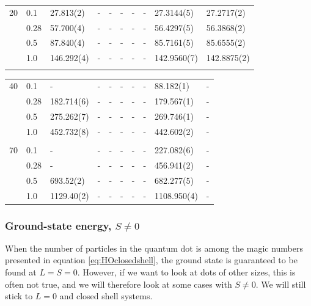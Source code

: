 {\begin{landscape}
\begin{table}
\begin{tabularx}{\hsize}{l:l|R{2.45cm}R{2.45cm}R{2.45cm}R{2.45cm}R{2.45cm}R{2.45cm}R{2.45cm}R{2.45cm}}
		20 & 0.1 & 27.813(2) & - & - & - & - & - & 27.3144(5) & 27.2717(2) \\ 
		& 0.28 & 57.700(4) & - & - & - & - & - & 56.4297(5) & 56.3868(2) \\
		& 0.5 & 87.840(4) & - & - & - & - & - & 85.7161(5) & 85.6555(2) \\
		& 1.0 & 146.292(4) & - & - & - & - & - & 142.9560(7) & 142.8875(2) \\ \hdashline 
	\end{tabularx}
\end{table}

\begin{table}
	\begin{tabularx}{\hsize}{l:l|R{2.45cm}R{2.45cm}R{2.45cm}R{2.45cm}R{2.45cm}R{2.45cm}R{2.45cm}R{2.45cm}}
		\label{tab:quantumdotswinteraction3D2}
		\\
		
		40 & 0.1 & - & - & - & - & - & - & 88.182(1) & - \\ 
		& 0.28 & 182.714(6) & - & - & - & - & - & 179.567(1) & - \\
		& 0.5 & 275.262(7) & - & - & - & - & - & 269.746(1) & - \\
		& 1.0 & 452.732(8) & - & - & - & - & - & 442.602(2) & - \\ \hdashline \\
		
		70 & 0.1 & - & - & - & - & - & - & 227.082(6) & - \\ 
		& 0.28 & - & - & - & - & - & - & 456.941(2) & - \\
		& 0.5 & 693.52(2) & - & - & - & - & - & 682.277(5) & - \\
		& 1.0 & 1129.40(2) & - & - & - & - & - & 1108.950(4) & - \\ \hline\hline
	\end{tabularx}
\end{table}
\end{landscape}
}

\subsubsection{Ground-state energy, $S\neq0$}
When the number of particles in the quantum dot is among the magic numbers presented in equation \eqref{eq:HOclosedshell}, the ground state is guaranteed to be found at $L=S=0$. However, if we want to look at dots of other sizes, this is often not true, and we will therefore look at some cases with $S\neq 0$. We will still stick to $L=0$ and closed shell systems.

